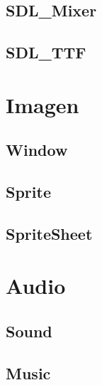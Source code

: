 \documentclass[parskip=half*]{scrartcl}
\begin{document}
	\subsection{SDL\_Mixer}

	\subsection{SDL\_TTF}


\newpage
\section{Imagen}
	\subsection{Window}

	\subsection{Sprite}

	\subsection{SpriteSheet}

\newpage
\section{Audio}
	\subsection{Sound}

	\subsection{Music}
\end{document}
